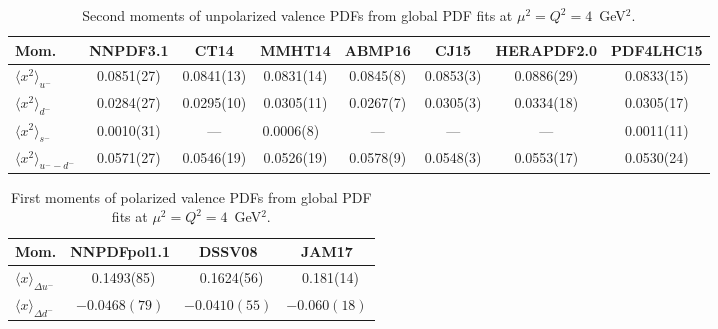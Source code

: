 \begin{table}[!t]
\centering
\small
\begin{tabular}{lccccccc}
\toprule
Mom. & NNPDF3.1 & CT14 & MMHT14 & ABMP16 & CJ15 & HERAPDF2.0 & PDF4LHC15 \\
\midrule
$\langle x^2\rangle_{u^-}$ 
& 0.0851(27) & 0.0841(13) & 0.0831(14)    
& 0.0845(8) & 0.0853(3) & 0.0886(29) & 0.0833(15) \\
$\langle x^2\rangle_{d^-}$
& 0.0284(27) & 0.0295(10) & 0.0305(11)    
& 0.0267(7) & 0.0305(3) & 0.0334(18) & 0.0305(17) \\ 
$\langle x^2\rangle_{s^-}$
& 0.0010(31) & ---        & 0.0006(8)\ \, 
& ---       & ---       & ---        & 0.0011(11) \\
$\langle x^2\rangle_{u^--d^-}$
& 0.0571(27) & 0.0546(19) & 0.0526(19)    
& 0.0578(9) & 0.0548(3) & 0.0553(17) & 0.0530(24) \\
\bottomrule
\end{tabular}
\caption{\small Second moments of unpolarized valence PDFs from 
global PDF fits at $\mu^2=Q^2=4$~GeV$^2$.}
\label{tab:unpHmoms}
\end{table}

\begin{table}[!t]
\centering
\footnotesize
\begin{tabular}{lccc}
\toprule
Mom. & NNPDFpol1.1 & DSSV08 & JAM17\\
\midrule
$\langle x\rangle_{\Delta u^-}$ 
& \ 0.1493(85) & \ 0.1624(56) & \ 0.181(14)\\
$\langle x\rangle_{\Delta d^-}$ 
&  $-0.0468(79)$ &  $-0.0410(55)$ &  $-0.060(18)$\\
\bottomrule
\end{tabular}
\caption{\small First moments of polarized valence PDFs from global 
PDF fits at $\mu^2=Q^2=4$~GeV$^2$.}
\label{tab:polHmoms}
\end{table}


